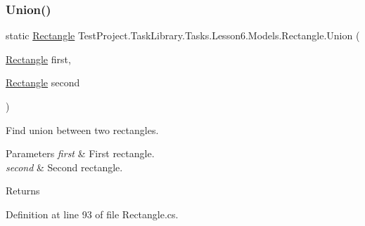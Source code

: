 \mbox{\label{class_test_project_1_1_task_library_1_1_tasks_1_1_lesson6_1_1_models_1_1_rectangle_a3da65a7a9d7e5b6cb3766c7128a49e26}} 
\subsubsection{\texorpdfstring{Union()}{Union()}}
{\footnotesize\ttfamily static \mbox{\hyperlink{class_test_project_1_1_task_library_1_1_tasks_1_1_lesson6_1_1_models_1_1_rectangle}{Rectangle}} Test\+Project.\+Task\+Library.\+Tasks.\+Lesson6.\+Models.\+Rectangle.\+Union (\begin{DoxyParamCaption}\item[{\mbox{\hyperlink{class_test_project_1_1_task_library_1_1_tasks_1_1_lesson6_1_1_models_1_1_rectangle}{Rectangle}}}]{first,  }\item[{\mbox{\hyperlink{class_test_project_1_1_task_library_1_1_tasks_1_1_lesson6_1_1_models_1_1_rectangle}{Rectangle}}}]{second }\end{DoxyParamCaption})\hspace{0.3cm}{\ttfamily [static]}}



Find union between two rectangles. 


\begin{DoxyParams}{Parameters}
{\em first} & First rectangle.\\
\hline
{\em second} & Second rectangle.\\
\hline
\end{DoxyParams}
\begin{DoxyReturn}{Returns}

\end{DoxyReturn}


Definition at line 93 of file Rectangle.\+cs.

\mbox{\label{class_test_project_1_1_task_library_1_1_tasks_1_1_lesson6_1_1_models_1_1_rectangle_a3e04e783432b8419633128bc394fb173}} 
